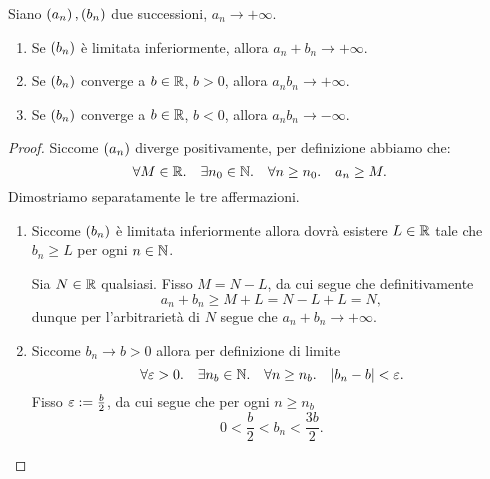 \begin{proposition}
     \label{prop:alg_inf_pos}
    Siano $\seqn*{a}, \seqn*{b}$ due successioni, $a_n \to +\infty$.
    \begin{enumerate}[label={(\roman*)}, ref={\theproposition: (\roman*)}]
        \item Se $\seqn*{b}$ è limitata inferiormente, allora $a_n + b_n \to +\infty$.
        \item Se $\seqn*{b}$ converge a $b \in \mathbb{R}$, $b > 0$, allora $a_nb_n \to +\infty$.
        \item Se $\seqn*{b}$ converge a $b \in \mathbb{R}$, $b < 0$, allora $a_nb_n \to -\infty$.
    \end{enumerate}
\end{proposition}
\begin{proof}
    Siccome $\seqn*{a}$ diverge positivamente, per definizione abbiamo che: \begin{equation}
        \forall M \in \mathbb{R}. \quad \exists n_0 \in \mathbb{N}. \quad \forall n \geq n_0. \quad a_n \geq M.
    \end{equation}
    Dimostriamo separatamente le tre affermazioni.
    \begin{enumerate}[label={(\roman*)}]
        \item Siccome $\seqn*{b}$ è limitata inferiormente allora dovrà esistere $L \in \mathbb{R}$ tale che $b_n \geq L$ per ogni $n \in \mathbb{N}$. 

        Sia $N \in \mathbb{R}$ qualsiasi. Fisso $M = N - L$, da cui segue che definitivamente \begin{equation*}
            a_n + b_n \geq M + L = N - L + L = N,
        \end{equation*}
        dunque per l'arbitrarietà di $N$ segue che $a_n + b_n \to +\infty$.
        \item Siccome $b_n \to b > 0$ allora per definizione di limite \[
            \forall \eps > 0. \quad \exists n_b \in \N. \quad \forall n \geq n_b. \quad \abs*{b_n - b} < \eps.
        \] Fisso $\varepsilon := \frac{b}{2}$, da cui segue che per ogni $n \geq n_b$ \[
            0 < \frac{b}{2} < b_n < \frac{3b}{2}.
        \]
        

\end{enumerate}
\end{proof}
